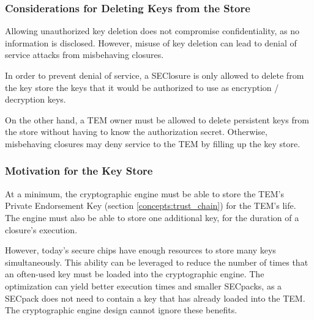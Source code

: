 \subsubsection{Considerations for Deleting Keys from the Store}
Allowing unauthorized key deletion does not compromise confidentiality, as no
information is disclosed. However, misuse of key deletion can lead to denial
of service attacks from misbehaving closures.

In order to prevent denial of service, a SEClosure is only allowed to delete from the key store the keys that it would be authorized to use as encryption / decryption keys.

On the other hand, a TEM owner must be allowed to delete persistent keys
from the store without having to know the authorization secret. Otherwise,
misbehaving closures may deny service to the TEM by filling up the key store.

\subsubsection{Motivation for the Key Store}
At a minimum, the cryptographic engine must be able to store the TEM's
Private Endorsement Key (section \ref{concepts:trust_chain}) for the TEM's
life. The engine must also be able to store one additional key, for the
duration of a closure's execution.

However, today's secure chips have enough resources to store many keys
simultaneously. This ability can be leveraged to reduce the number of times
that an often-used key must be loaded into the cryptographic engine. The
optimization can yield better execution times and smaller SECpacks, as a
SECpack does not need to contain a key that has already loaded into the TEM.
The cryptographic engine design cannot ignore these benefits.

